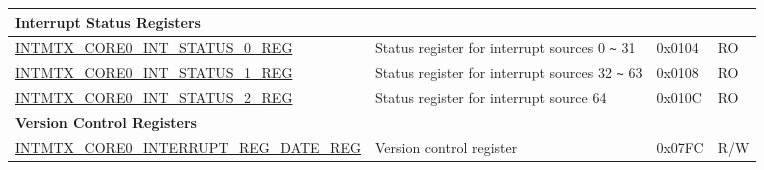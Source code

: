 \begin{longtable}{ | p{10cm} | p{10cm} | p{1.3cm} | p{1cm} | }
\multicolumn{4}{|l|}{\textbf{Interrupt Status Registers}} \\ \hline
\hyperref[regdesc:INTMTXCORE0INTSTATUS0REG]{INTMTX\_CORE0\_INT\_STATUS\_0\_REG} & Status register for interrupt sources 0 \verb+~+ 31  & 0x0104 & RO \\ \hline
\hyperref[regdesc:INTMTXCORE0INTSTATUS1REG]{INTMTX\_CORE0\_INT\_STATUS\_1\_REG} & Status register for interrupt sources 32 \verb+~+ 63  & 0x0108 & RO \\ \hline
\hyperref[regdesc:INTMTXCORE0INTSTATUS2REG]{INTMTX\_CORE0\_INT\_STATUS\_2\_REG} & Status register for interrupt source 64  & 0x010C & RO \\ \hline
\multicolumn{4}{|l|}{\textbf{Version Control Registers}} \\ \hline
\hyperref[regdesc:INTMTXCORE0INTERRUPTREGDATEREG]{INTMTX\_CORE0\_INTERRUPT\_REG\_DATE\_REG} & Version control register & 0x07FC & R/W \\ \hline
\end{longtable}
